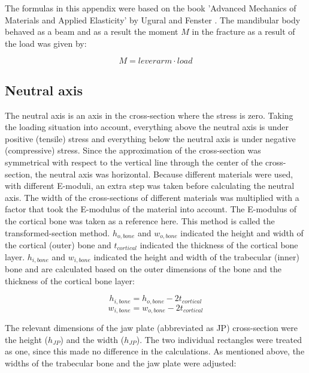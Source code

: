 \begin{subappendices}
\noindent The formulas in this appendix were based on the book 'Advanced Mechanics of Materials and Applied Elasticity' by Ugural and Fenster \cite{beamtheory}. The mandibular body behaved as a beam and as a result the moment $M$ in the fracture as a result of the load was given by:

\begin{equation}
M=lever arm\cdot load
\end{equation}

\subsection{Neutral axis}

The neutral axis is an axis in the cross-section where the stress is zero. Taking the loading situation into account, everything above the neutral axis is under positive (tensile) stress and everything below the neutral axis is under negative (compressive) stress. Since the approximation of the cross-section was symmetrical with respect to the vertical line through the center of the cross-section, the neutral axis was horizontal. Because different materials were used, with different E-moduli, an extra step was taken before calculating the neutral axis. The width of the cross-sections of different materials was multiplied with a factor that took the E-modulus of the material into account. The E-modulus of the cortical bone was taken as a reference here. This method is called the transformed-section method. $h_{o,bone}$ and $w_{o,bone}$ indicated the height and width of the cortical (outer) bone and $t_{cortical}$ indicated the thickness of the cortical bone layer. $h_{i,bone}$ and $w_{i,bone}$ indicated the height and width of the trabecular (inner) bone and are calculated based on the outer dimensions of the bone and the thickness of the cortical bone layer:

\begin{equation}
h_{i,bone}=h_{o,bone}-2t_{cortical}
\end{equation}
\begin{equation}
w_{i,bone}=w_{o,bone}-2t_{cortical}
\end{equation}

\noindent The relevant dimensions of the jaw plate (abbreviated as JP) cross-section were the height ($h_{JP}$) and the width ($h_{JP}$). The two individual rectangles were treated as one, since this made no difference in the calculations. As mentioned above, the widths of the trabecular bone and the jaw plate were adjusted:


\end{subappendices}
